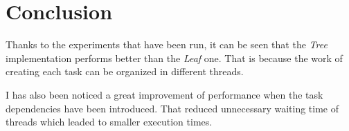 \documentclass[a4paper]{article}
\begin{document}
\section{Conclusion}
Thanks to the experiments that have been run, it can be seen that the \emph{Tree} implementation performs better than the \emph{Leaf} one. That is because the work of creating each task can be organized in different threads.

I has also been noticed a great improvement of performance when the task dependencies have been introduced. That reduced unnecessary waiting time of threads which leaded to smaller execution times.
\end{document}
